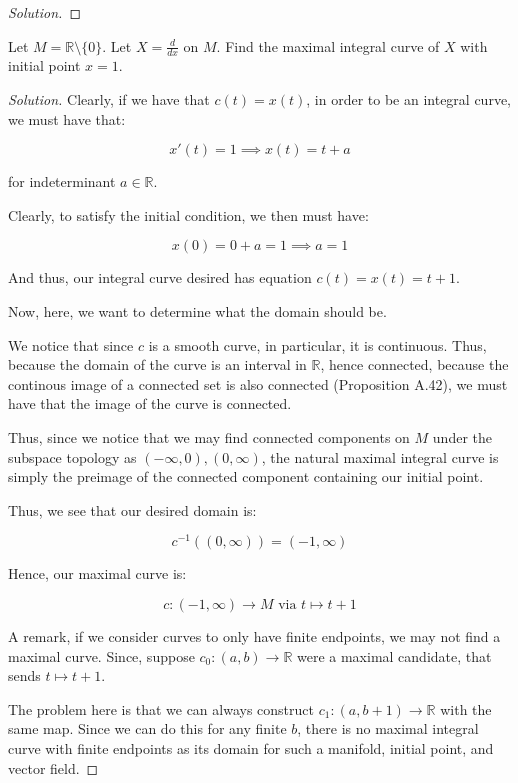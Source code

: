 \documentclass[10pt]{article}
\newenvironment{problem}[2][]{\begin{trivlist}
\item[\hskip \labelsep {\bfseries #1}\hskip \labelsep {\bfseries #2.}]}{\end{trivlist}}
\begin{document}
\begin{proof}[Solution]


\end{proof}

\begin{problem}{Question 4}

Let $M = \mathbb{R} \setminus \{ 0 \}$. Let $X = \frac{d}{dx}$ on $M$. Find the maximal integral curve of $X$ with initial point $x = 1$.


\end{problem}

\begin{proof}[Solution]

Clearly, if we have that $c(t) = x(t)$, in order to be an integral curve, we must have that:

$$ x'(t) = 1 \implies x(t) = t + a$$

for indeterminant $a\in \mathbb{R}$.

Clearly, to satisfy the initial condition, we then must have:

$$x(0) = 0 + a = 1 \implies a = 1$$

And thus, our integral curve desired has equation $c(t) = x(t) = t + 1$.

Now, here, we want to determine what the domain should be.

We notice that since $c$ is a smooth curve, in particular, it is continuous. Thus, because the domain of the curve is an interval in $\mathbb{R}$, hence connected, because the continous image of a connected set is also connected (Proposition A.42), we must have that the image of the curve is connected.

Thus, since we notice that we may find connected components on $M$ under the subspace topology as $(-\infty, 0), (0, \infty)$, the natural maximal integral curve is simply the preimage of the connected component containing our initial point.

Thus, we see that our desired domain is:

$$c^{-1}((0, \infty)) = (-1, \infty)$$

Hence, our maximal curve is:

$$c: (-1, \infty) \to M \text{ via } t \mapsto t+1 $$

A remark,  if we consider curves to only have finite endpoints, we may not find a maximal curve. Since, suppose $c_0: (a,b) \to \mathbb{R}$ were a maximal candidate, that sends $t \mapsto t+1$.

The problem here is that we can always construct $c_1: (a, b+1) \to \mathbb{R}$ with the same map. Since we can do this for any finite $b$, there is no maximal integral curve with finite endpoints as its domain for such a manifold, initial point, and vector field.



\end{proof}
\end{document}
